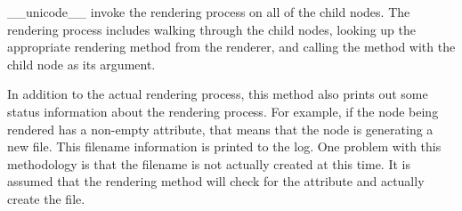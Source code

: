 \begin{methoddesc}[Renderable]{__unicode__}{}
invoke the rendering process on all of the child nodes.  The rendering process
includes walking through the child nodes, looking up the appropriate 
rendering method from the renderer, and calling the method with the child
node as its argument.

In addition to the actual rendering process, this method also prints out 
some status information about the rendering process.  For example, if 
the node being rendered has a non-empty  attribute, that
means that the node is generating a new file.  This filename information
is printed to the log.  One problem with this methodology is that the 
filename is not actually created at this time.  It is assumed that the
rendering method will check for the  attribute and actually
create the file.
\end{methoddesc}

